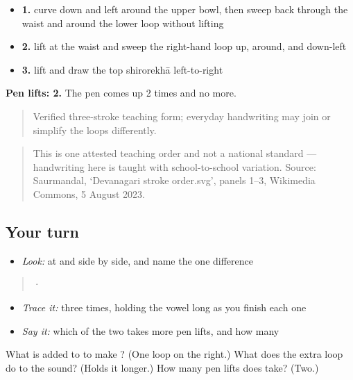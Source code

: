 \begin{itemize}
\raggedright
  \item \textbf{1.} curve down and left around the upper bowl, then sweep back through the waist and around the lower loop without lifting
  \item \textbf{2.} lift at the waist and sweep the right-hand loop up, around, and down-left
  \item \textbf{3.} lift and draw the top shirorekhā left-to-right
\end{itemize}

\textbf{Pen lifts: 2.} The pen comes up 2 times and no more.

\begin{quote}
Verified three-stroke teaching form; everyday handwriting may join or simplify the loops differently.
\end{quote}

\begin{quote}
This is one attested teaching order and not a national standard — handwriting here is taught with school-to-school variation. Source: Saurmandal, ‘Devanagari  stroke order.svg’, panels 1–3, Wikimedia Commons, 5 August 2023.
\end{quote}

\subsection*{Your turn}
\begin{itemize}
\raggedright
  \item \emph{Look:} at  and  side by side, and name the one difference
\end{itemize}

\begin{quote}
  ·  
\end{quote}

\begin{itemize}
\raggedright
  \item \emph{Trace it:}  three times, holding the vowel long as you finish each one
  \item \emph{Say it:} which of the two takes more pen lifts, and how many
\end{itemize}

\begin{tcolorbox}[breakable,colback=teal!4,colframe=teal!35!black,title={Before you move on}]
What is added to \textbf{} to make \textbf{}? (One loop on the right.) What does the extra loop do to the sound? (Holds it longer.) How many pen lifts does \textbf{} take? (Two.)
\end{tcolorbox}
